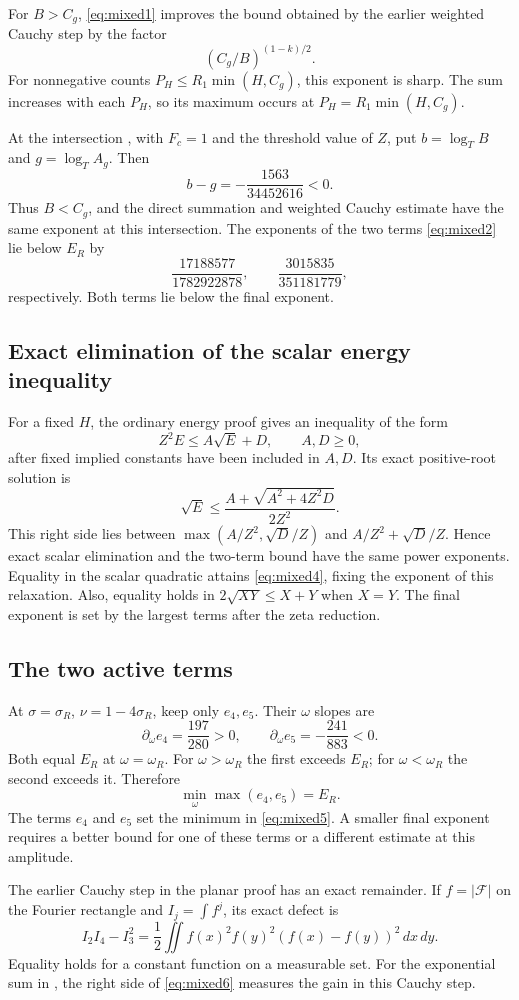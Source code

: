 For $B>C_g$, \eqref{eq:mixed1} improves the bound obtained by the earlier weighted
Cauchy step by the factor
\[
 (C_g/B)^{(1-k)/2}.
\]
For nonnegative counts $P_H\le R_1\min(H,C_g)$, this exponent is
sharp. The sum increases with each $P_H$, so its maximum occurs at
$P_H=R_1\min(H,C_g)$.

At the intersection \cite[(\ref*{p-eq:contact})]{Thin}, with $F_c=1$ and the threshold value of $Z$,
put $b=\log_T B$ and $g=\log_T A_g$. Then
\[
b-g=-\frac{1563}{34452616}<0.
\]
Thus $B<C_g$, and the direct summation and weighted Cauchy estimate
have the same exponent at this intersection.
The exponents of the two terms \eqref{eq:mixed2} lie below $E_R$ by
\[
\frac{17188577}{1782922878},\qquad
\frac{3015835}{351181779},
\]
respectively. Both terms lie below the final exponent.

\subsection{Exact elimination of the scalar energy inequality}
For a fixed $H$, the ordinary energy proof gives an inequality of the form
\[
 Z^2E\le A\sqrt E+D,
 \qquad A,D\ge0,
\]
after fixed implied constants have been included in $A,D$.
Its exact positive-root solution is
\begin{equation}
 \sqrt E\le\frac{A+\sqrt{A^2+4Z^2D}}{2Z^2}.
 \label{eq:mixed4}
\end{equation}
This right side lies between
$\max(A/Z^2,\sqrt D/Z)$ and $A/Z^2+\sqrt D/Z$.
Hence exact scalar elimination and the two-term bound have the
same power exponents. Equality in the scalar quadratic attains \eqref{eq:mixed4}, fixing the exponent of this relaxation.
Also, equality holds in $2\sqrt{XY}\le X+Y$ when $X=Y$.
The final exponent is set by the largest terms after the zeta reduction.

\subsection{The two active terms}
At $\sigma=\sigma_R$, $\nu=1-4\sigma_R$, keep only $e_4,e_5$.
Their $\omega$ slopes are
\[
 \partial_\omega e_4=\frac{197}{280}>0,\qquad
 \partial_\omega e_5=-\frac{241}{883}<0.
\]
Both equal $E_R$ at $\omega=\omega_R$. For $\omega>\omega_R$ the first exceeds $E_R$;
for $\omega<\omega_R$ the second exceeds it. Therefore
\begin{equation}
 \min_\omega\max(e_4,e_5)=E_R.
 \label{eq:mixed5}
\end{equation}
The terms $e_4$ and $e_5$ set the minimum in \eqref{eq:mixed5}.
A smaller final exponent requires a better bound for one of these terms
or a different estimate at this amplitude.

The earlier Cauchy step in the planar proof has an exact remainder. If $f=|\mathcal F|$ on the Fourier rectangle and $I_j=\int f^j$, its
exact defect is
\begin{equation}
 I_2I_4-I_3^2
 =\frac12\iint f(x)^2f(y)^2(f(x)-f(y))^2\,dx\,dy.
 \label{eq:mixed6}
\end{equation}
Equality holds for a constant function on a measurable set.
For the exponential sum in \cite[Section 2]{Thin}, the right side of \eqref{eq:mixed6}
measures the gain in this Cauchy step.
